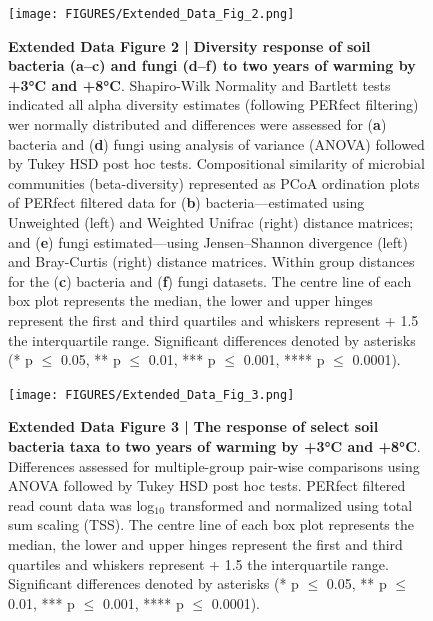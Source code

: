 \documentclass[
  letterpaper,
  DIV=11,
  numbers=noendperiod]{scrartcl}
\begin{document}
\begin{figure}

{\centering \texttt{[image: FIGURES/Extended\_Data\_Fig\_2.png]}

}

\caption{\textbf{Extended Data Figure 2 |}
\textbf{Diversity response of soil bacteria (a--c) and fungi (d--f) to two years of warming by +3°C and +8°C}.
Shapiro-Wilk Normality and Bartlett tests indicated all alpha diversity
estimates (following PERfect filtering) wer normally distributed and
differences were assessed for (\textbf{a}) bacteria and (\textbf{d})
fungi using analysis of variance (ANOVA) followed by Tukey HSD post hoc
tests. Compositional similarity of microbial communities
(beta-diversity) represented as PCoA ordination plots of PERfect
filtered data for (\textbf{b}) bacteria---estimated using Unweighted
(left) and Weighted Unifrac (right) distance matrices; and (\textbf{e})
fungi estimated---using Jensen--Shannon divergence (left) and
Bray-Curtis (right) distance matrices. Within group distances for the
(\textbf{c}) bacteria and (\textbf{f}) fungi datasets. The centre line
of each box plot represents the median, the lower and upper hinges
represent the first and third quartiles and whiskers represent + 1.5 the
interquartile range. Significant differences denoted by asterisks (* p
\(\le\) 0.05, ** p \(\le\) 0.01, *** p \(\le\) 0.001, **** p \(\le\)
0.0001).}

\end{figure}

\begin{figure}

{\centering \texttt{[image: FIGURES/Extended\_Data\_Fig\_3.png]}

}

\caption{\textbf{Extended Data Figure 3 |}
\textbf{The response of select soil bacteria taxa to two years of warming by +3°C and +8°C}.
Differences assessed for multiple-group pair-wise comparisons using
ANOVA followed by Tukey HSD post hoc tests. PERfect filtered read count
data was log\(_{10}\) transformed and normalized using total sum scaling
(TSS). The centre line of each box plot represents the median, the lower
and upper hinges represent the first and third quartiles and whiskers
represent + 1.5 the interquartile range. Significant differences denoted
by asterisks (* p \(\le\) 0.05, ** p \(\le\) 0.01, *** p \(\le\) 0.001,
**** p \(\le\) 0.0001).}

\end{figure}
\end{document}
